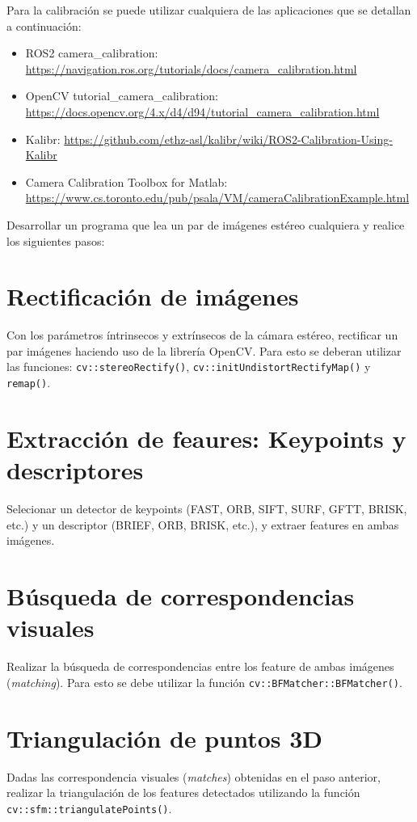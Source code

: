 \documentclass[tp]{lcc}
\begin{document}
Para la calibración se puede utilizar cualquiera de las aplicaciones que se detallan a continuación:
\begin{itemize}
	\item ROS2 camera\_calibration:  \url{https://navigation.ros.org/tutorials/docs/camera_calibration.html}
	\item OpenCV tutorial\_camera\_calibration:\\ \url{https://docs.opencv.org/4.x/d4/d94/tutorial_camera_calibration.html}
	\item Kalibr: \url{https://github.com/ethz-asl/kalibr/wiki/ROS2-Calibration-Using-Kalibr}
	\item Camera Calibration Toolbox for Matlab:\\ \url{https://www.cs.toronto.edu/pub/psala/VM/cameraCalibrationExample.html}
\end{itemize}

Desarrollar un programa que lea un par de imágenes estéreo cualquiera y realice los siguientes pasos:

\section{Rectificación de imágenes}
Con los parámetros íntrinsecos y extrínsecos de la cámara estéreo, rectificar un par imágenes haciendo uso de la librería OpenCV. Para esto se deberan utilizar las funciones:  \lstinline{cv::stereoRectify()},  \lstinline{cv::initUndistortRectifyMap()} y  \lstinline{remap()}.

\section{Extracción de feaures: Keypoints y descriptores}
Selecionar un detector de keypoints (FAST, ORB, SIFT, SURF, GFTT, BRISK, etc.) y un descriptor (BRIEF, ORB, BRISK, etc.), y extraer features en ambas imágenes.

\section{Búsqueda de correspondencias visuales}
Realizar la búsqueda de correspondencias entre los feature de ambas imágenes (\emph{matching}). Para esto se debe utilizar la función \lstinline{cv::BFMatcher::BFMatcher()}. 

\section{Triangulación de puntos 3D}
Dadas las correspondencia visuales (\emph{matches}) obtenidas en el paso anterior, realizar la triangulación de los features detectados utilizando la función \lstinline{cv::sfm::triangulatePoints()}.
\end{document}
